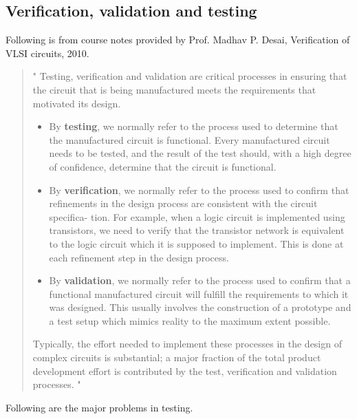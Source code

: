 \subsection{Verification, validation and testing}

Following is from course notes provided by Prof. Madhav P. Desai, Verification
of VLSI circuits, 2010.

\begin{quotation}
"
Testing, verification and validation are critical processes in ensuring that the
circuit that is being manufactured meets the requirements that motivated its
design.

\begin{itemize}

\item By \textbf{testing}, we normally refer to the process used to determine
that the manufactured circuit is functional. Every manufactured circuit needs to
be tested, and the result of the test should, with a high degree of confidence,
determine that the circuit is functional.

\item By \textbf{verification}, we normally refer to the process used to confirm
that refinements in the design process are consistent with the circuit
specifica- tion. For example, when a logic circuit is implemented using
transistors, we need to verify that the transistor network is equivalent to the
logic circuit which it is supposed to implement. This is done at each refinement
step in the design process.

\item By \textbf{validation}, we normally refer to the process used to confirm
that a functional manufactured circuit will fulfill the requirements to which it
was designed. This usually involves the construction of a prototype and a test
setup which mimics reality to the maximum extent possible.  

\end{itemize}

Typically, the effort needed to implement these processes in the design of
complex circuits is substantial; a major fraction of the total product
development effort is contributed by the test, verification and validation
processes.  
"
\end{quotation}

Following are the major problems in testing.

